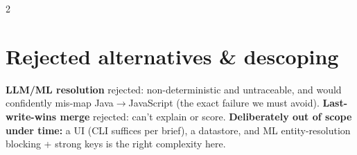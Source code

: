 \documentclass[10pt]{article}
\newcommand{\fld}[1]{{\ttfamily\footnotesize #1}}
\begin{document}
\begin{multicols}{2}
\section{Rejected alternatives \& descoping}
\textbf{LLM/ML resolution} \textemdash{} rejected: non-deterministic and
untraceable, and would confidently mis-map \fld{Java}$\to$\fld{JavaScript} (the
exact failure we must avoid). \textbf{Last-write-wins merge} \textemdash{}
rejected: can't explain or score. \textbf{Deliberately out of scope under time:}
a UI (CLI suffices per brief), a datastore, and ML entity-resolution \textemdash{}
blocking + strong keys is the right complexity here.

\end{multicols}
\end{document}
